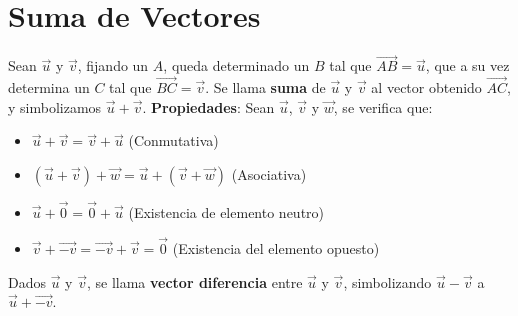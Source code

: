 \documentclass[11pt,a4paper]{article}
\begin{document}
\section{Suma de Vectores}
\noindent Sean $\overrightarrow{u}$ y $\overrightarrow{v}$, fijando un $A$, queda determinado un $B$ tal que $\overrightarrow{AB} = \overrightarrow{u}$, que a su vez determina un $C$ tal que $\overrightarrow{BC} = \overrightarrow{v}$. Se llama \textbf{suma} de $\overrightarrow{u}$ y $\overrightarrow{v}$ al vector obtenido $\overrightarrow{AC}$, y simbolizamos $\overrightarrow{u} + \overrightarrow{v}$.
\textbf{Propiedades}: Sean $\overrightarrow{u}$, $\overrightarrow{v}$ y $\overrightarrow{w}$, se verifica que:
\begin{itemize}
\item $\overrightarrow{u} + \overrightarrow{v} = \overrightarrow{v} + \overrightarrow{u}$ (Conmutativa)
\item $(\overrightarrow{u} + \overrightarrow{v})+\overrightarrow{w} = \overrightarrow{u} + (\overrightarrow{v}+\overrightarrow{w})$ (Asociativa)
\item $\overrightarrow{u} + \overrightarrow{0} = \overrightarrow{0} + \overrightarrow{u}$ (Existencia de elemento neutro)
\item $\overrightarrow{v} + \overrightarrow{-v} = \overrightarrow{-v} + \overrightarrow{v} = \overrightarrow{0}$ (Existencia del elemento opuesto)
\end{itemize}
Dados $\overrightarrow{u}$ y $\overrightarrow{v}$, se llama \textbf{vector diferencia} entre $\overrightarrow{u}$ y $\overrightarrow{v}$, simbolizando $\overrightarrow{u} -\overrightarrow{v}$ a $\overrightarrow{u} + \overrightarrow{-v}$. 
\end{document}
